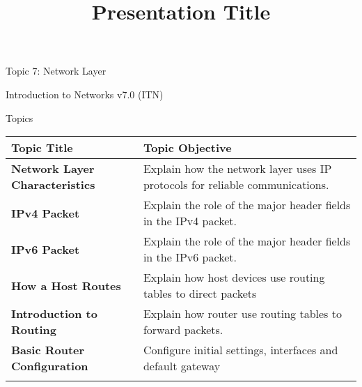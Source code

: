 \documentclass[
  ignorenonframetext,
]{beamer}
\title{Presentation Title}
\author{}
\date{}
\begin{document}
\frame{\titlepage}


\begin{frame}{Topic 7: Network Layer}
\label{topic-7-network-layer}
\end{frame}

\begin{frame}{Introduction to Networks v7.0 (ITN)}
\label{introduction-to-networks-v7.0-itn}
\end{frame}

\begin{frame}{Topics}
\label{topics}
\begin{longtable}[]{@{}
  >{\centering\arraybackslash}p{}
  >{\centering\arraybackslash}p{}@{}}
\toprule\noalign{}
\begin{minipage}[b]{\linewidth}\centering
\textbf{Topic Title}
\end{minipage} & \begin{minipage}[b]{\linewidth}\centering
\textbf{Topic Objective}
\end{minipage} \\
\midrule\noalign{}
\endhead
\textbf{Network Layer Characteristics} & Explain how the network layer
uses IP protocols for reliable communications. \\
\textbf{IPv4 Packet} & Explain the role of the major header fields in
the IPv4 packet. \\
\textbf{IPv6 Packet} & Explain the role of the major header fields in
the IPv6 packet. \\
\textbf{How a Host Routes} & Explain how host devices use routing tables
to direct packets \\
\textbf{Introduction to Routing} & Explain how router use routing tables
to forward packets. \\
\textbf{Basic Router Configuration} & Configure initial settings,
interfaces and default gateway \\
\bottomrule\noalign{}
\end{longtable}

\end{frame}
\end{document}
